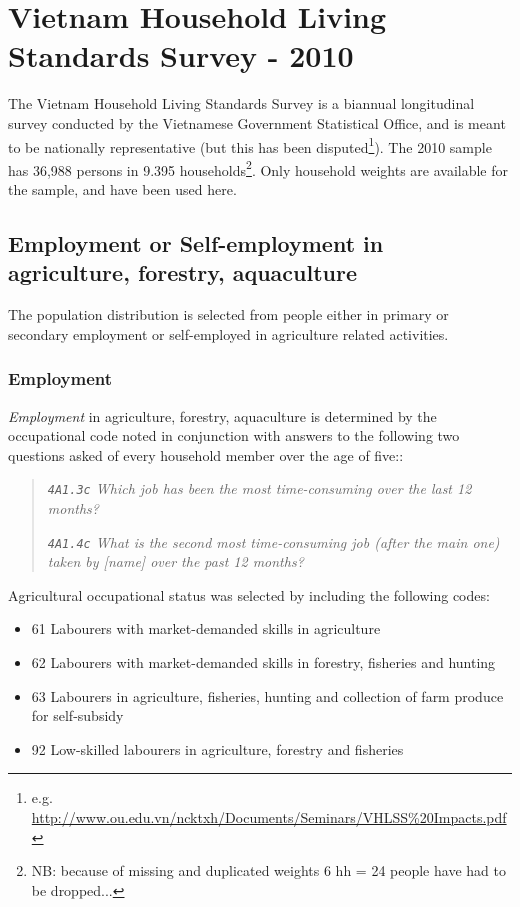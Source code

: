 \documentclass{article}
\begin{document}
\section{Vietnam Household Living Standards Survey - 2010}

   The Vietnam Household Living Standards Survey is a biannual longitudinal survey
conducted by the Vietnamese Government Statistical Office, and is meant to be nationally representative (but this has been disputed\footnote{e.g. \url{http://www.ou.edu.vn/ncktxh/Documents/Seminars/VHLSS\%20Impacts.pdf}}). The 2010 sample has 36,988 persons in 9.395 households\footnote{NB: because of missing and duplicated weights 6 hh = 24 people have had to be dropped...}. Only household weights are available for the sample, and have been used here. 


\subsection{Employment or Self-employment in agriculture, forestry, aquaculture}\label{Sec:Vagr}

The population distribution is selected from people either in primary or secondary employment or self-employed in agriculture related activities. 

\subsubsection{Employment}

\emph{Employment} in agriculture, forestry, aquaculture is determined by the occupational code noted in conjunction with answers to the following two questions asked of every household member over the age of five::

\begin{quote}
\emph{\texttt{4A1.3c} Which job has been the most time-consuming over the last 12 months?}

\emph{\texttt{4A1.4c} What is the second most time-consuming job (after the main one) taken by [name] over the past 12 months?}
\end{quote}

\noindent Agricultural occupational status was selected by including the following codes:

\begin{itemize}
\item 61	Labourers with market-demanded skills in agriculture
\item 62	Labourers with market-demanded skills in forestry, fisheries and hunting
\item 63	Labourers in agriculture, fisheries, hunting and collection of farm produce for self-subsidy
\item 92	Low-skilled labourers in agriculture, forestry and fisheries

\end{itemize}
\end{document}
